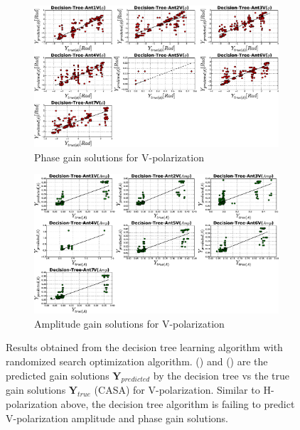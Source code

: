 \begin{figure}[H]
   \centering
    \begin{subfigure}[t]{0.52\textheight}
        
        \includegraphics[width=\textwidth]{images/Decision-TreeVphase.eps} 
        \caption{Phase gain solutions for V-polarization}
         \label{A1}
    \end{subfigure}
    
      \begin{subfigure}[t]{0.52\textheight}
       
        \includegraphics[width=\textwidth]{images/Decision-TreeVamp.eps} 
        \caption{Amplitude gain solutions for V-polarization} 
        \label{B1}
    \end{subfigure}
    \caption{Results obtained from the decision tree learning algorithm with randomized search optimization algorithm. () and () are the predicted gain solutions $\textbf{Y}_{predicted}$ by the decision tree vs the true gain solutions $\textbf{Y}_{true}$ (CASA) for V-polarization. Similar to H-polarization above, the decision tree algorithm is failing to predict V-polarization amplitude and phase gain solutions.}
 \label{BB1}
    \end{figure}
    
